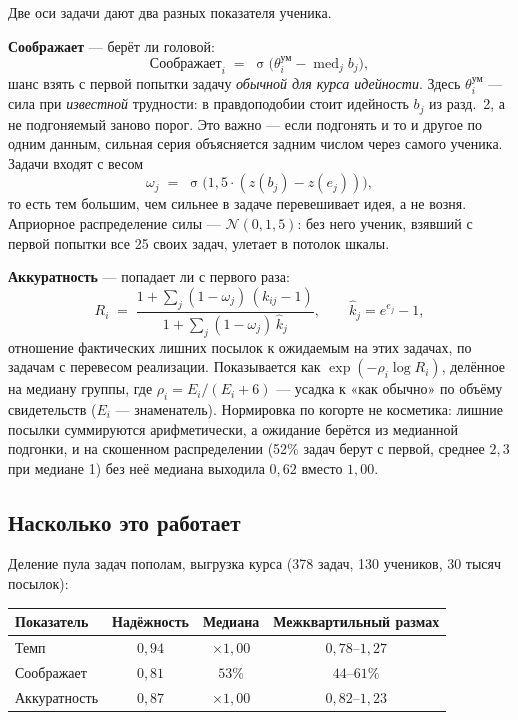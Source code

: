 \documentclass[11pt,a4paper]{article}
\newcommand{\med}{\operatorname{med}}
\newcommand{\sig}{\operatorname{\sigma}}
\begin{document}
Две оси задачи дают два разных показателя ученика.

\textbf{Соображает} --- берёт ли головой:
\[
  \text{Соображает}_i \;=\; \sig\bigl(\theta^{\text{ум}}_i - \med_j b_j\bigr),
\]
шанс взять с первой попытки задачу \emph{обычной для курса идейности}. Здесь
$\theta^{\text{ум}}_i$ --- сила при \emph{известной} трудности: в правдоподобии
стоит идейность $b_j$ из разд.~2, а не подгоняемый заново порог. Это важно ---
если подгонять и то и другое по одним данным, сильная серия объясняется задним
числом через самого ученика. Задачи входят с весом
\[
  \omega_j \;=\; \sig\bigl(1{,}5 \cdot (z(b_j) - z(e_j))\bigr),
\]
то есть тем большим, чем сильнее в задаче перевешивает идея, а не возня.
Априорное распределение силы --- $\mathcal N(0, 1{,}5)$: без него ученик,
взявший с первой попытки все 25 своих задач, улетает в потолок шкалы.

\textbf{Аккуратность} --- попадает ли с первого раза:
\[
  R_i \;=\; \frac{1 + \sum_j (1-\omega_j)\,(k_{ij}-1)}
                 {1 + \sum_j (1-\omega_j)\,\hat k_j},
  \qquad
  \hat k_j = e^{e_j} - 1,
\]
отношение фактических лишних посылок к ожидаемым на этих задачах, по задачам с
перевесом реализации. Показывается как $\exp(-\rho_i \log R_i)$, делённое на
медиану группы, где $\rho_i = E_i/(E_i + 6)$ --- усадка к «как обычно» по объёму
свидетельств ($E_i$ --- знаменатель). Нормировка по когорте не косметика:
лишние посылки суммируются арифметически, а ожидание берётся из медианной
подгонки, и на скошенном распределении (52\% задач берут с первой, среднее
$2{,}3$ при медиане 1) без неё медиана выходила $0{,}62$ вместо $1{,}00$.

\subsection*{Насколько это работает}

Деление пула задач пополам, выгрузка курса (378 задач, 130 учеников, 30 тысяч
посылок):

\begin{center}
\begin{tabular}{@{}lccc@{}}
\toprule
Показатель & Надёжность & Медиана & Межквартильный размах \\
\midrule
Темп          & $0{,}94$ & $\times 1{,}00$ & $0{,}78$--$1{,}27$ \\
Соображает    & $0{,}81$ & $53\%$          & $44$--$61\%$ \\
Аккуратность  & $0{,}87$ & $\times 1{,}00$ & $0{,}82$--$1{,}23$ \\
\bottomrule
\end{tabular}
\end{center}
\end{document}
